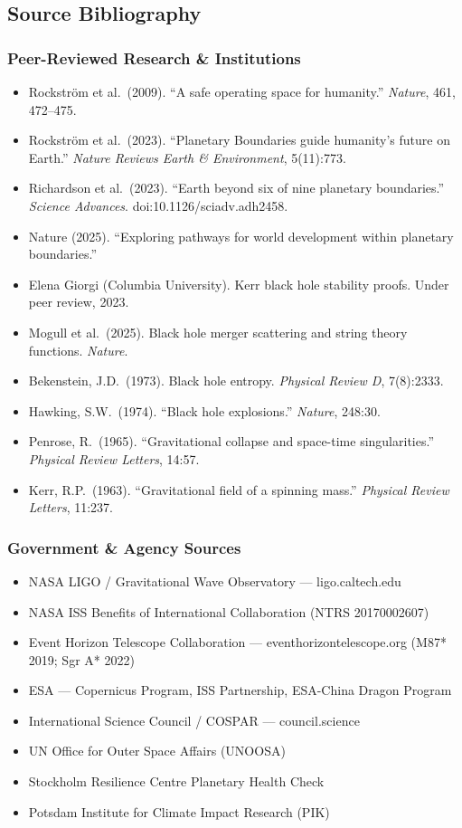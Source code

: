 \documentclass[11pt,letterpaper]{article}
\begin{document}
\subsection{Source Bibliography}

\subsubsection*{Peer-Reviewed Research \& Institutions}

\begin{itemize}[noitemsep]
\item Rockstr{\"o}m et al.\ (2009). ``A safe operating space for humanity.'' \textit{Nature}, 461, 472--475.
\item Rockstr{\"o}m et al.\ (2023). ``Planetary Boundaries guide humanity's future on Earth.'' \textit{Nature Reviews Earth \& Environment}, 5(11):773.
\item Richardson et al.\ (2023). ``Earth beyond six of nine planetary boundaries.'' \textit{Science Advances}. doi:10.1126/sciadv.adh2458.
\item Nature (2025). ``Exploring pathways for world development within planetary boundaries.''
\item Elena Giorgi (Columbia University). Kerr black hole stability proofs. Under peer review, 2023.
\item Mogull et al.\ (2025). Black hole merger scattering and string theory functions. \textit{Nature}.
\item Bekenstein, J.D.\ (1973). Black hole entropy. \textit{Physical Review D}, 7(8):2333.
\item Hawking, S.W.\ (1974). ``Black hole explosions.'' \textit{Nature}, 248:30.
\item Penrose, R.\ (1965). ``Gravitational collapse and space-time singularities.'' \textit{Physical Review Letters}, 14:57.
\item Kerr, R.P.\ (1963). ``Gravitational field of a spinning mass.'' \textit{Physical Review Letters}, 11:237.
\end{itemize}

\subsubsection*{Government \& Agency Sources}
\begin{itemize}[noitemsep]
\item NASA LIGO / Gravitational Wave Observatory --- ligo.caltech.edu
\item NASA ISS Benefits of International Collaboration (NTRS 20170002607)
\item Event Horizon Telescope Collaboration --- eventhorizontelescope.org (M87* 2019; Sgr A* 2022)
\item ESA --- Copernicus Program, ISS Partnership, ESA-China Dragon Program
\item International Science Council / COSPAR --- council.science
\item UN Office for Outer Space Affairs (UNOOSA)
\item Stockholm Resilience Centre Planetary Health Check
\item Potsdam Institute for Climate Impact Research (PIK)
\end{itemize}
\end{document}
